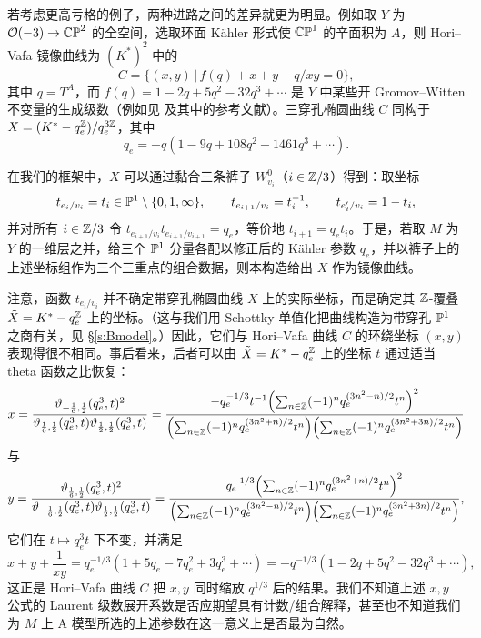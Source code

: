 若考虑更高亏格的例子，两种进路之间的差异就更为明显。例如取 $Y$ 为 $\mathcal{O}(-3)\to\mathbb{CP}^2$ 的全空间，选取环面 K\"ahler 形式使 $\mathbb{CP}^1$ 的辛面积为 $A$，则 Hori--Vafa 镜像曲线为 $(K^*)^2$ 中的
\[
C=\{(x,y)\,|\,f(q)+x+y+q/xy=0\},
\]
其中 $q=T^A$，而 $f(q)=1-2q+5q^2-32q^3+\cdots$ 是 $Y$ 中某些开 Gromov--Witten 不变量的生成级数（例如见 \cite[\S 5.3.3]{ChanLauLeung} 及其中的参考文献）。三穿孔椭圆曲线 $C$ 同构于 $X=(K^*-q_e^{\mathbb{Z}})/q_e^{3\mathbb{Z}}$，其中
\[
q_e=-q(1-9q+108q^2-1461q^3+\cdots).
\]

在我们的框架中，$X$ 可以通过黏合三条裤子 $W^0_{v_i}$（$i\in\mathbb{Z}/3$）得到：取坐标
\[
t_{e_i/v_i}=t_i\in\mathbb{P}^1\setminus\{0,1,\infty\},\qquad
t_{e_{i+1}/v_i}=t_i^{-1},\qquad t_{e'_i/v_i}=1-t_i,
\]
并对所有 $i\in\mathbb{Z}/3$ 令 $t_{e_{i+1}/v_i}t_{e_{i+1}/v_{i+1}}=q_e$，等价地 $t_{i+1}=q_et_i$。于是，若取 $M$ 为 $Y$ 的一维层之并，给三个 $\mathbb{P}^1$ 分量各配以修正后的 K\"ahler 参数 $q_e$，并以裤子上的上述坐标组作为三个三重点的组合数据，则本构造给出 $X$ 作为镜像曲线。

注意，函数 $t_{e_i/v_i}$ 并不确定带穿孔椭圆曲线 $X$ 上的实际坐标，而是确定其 $\mathbb{Z}$-覆叠 $\tilde X=K^*-q_e^{\mathbb{Z}}$ 上的坐标。（这与我们用 Schottky 单值化把曲线构造为带穿孔 $\mathbb{P}^1$ 之商有关，见 §\ref{s:Bmodel}。）因此，它们与 Hori--Vafa 曲线 $C$ 的环绕坐标 $(x,y)$ 表现得很不相同。事后看来，后者可以由 $\tilde X=K^*-q_e^{\mathbb{Z}}$ 上的坐标 $t$ 通过适当 theta 函数之比恢复：
\[
x=\frac{\vartheta_{-\frac16,\frac12}(q_e^3,t)^2}
{\vartheta_{\frac16,\frac12}(q_e^3,t)\vartheta_{\frac12,\frac12}(q_e^3,t)}=
\frac{-q_e^{-1/3}t^{-1}\Bigl(\sum_{n\in\mathbb{Z}}(-1)^n q_e^{(3n^2-n)/2}t^n\Bigr)^2}
{\Bigl(\sum_{n\in\mathbb{Z}}(-1)^n q_e^{(3n^2+n)/2}t^n\Bigr)
\Bigl(\sum_{n\in\mathbb{Z}}(-1)^n q_e^{(3n^2+3n)/2}t^n\Bigr)}
\]
与
\[
y=\frac{\vartheta_{\frac16,\frac12}(q_e^3,t)^2}
{\vartheta_{-\frac16,\frac12}(q_e^3,t)\vartheta_{\frac12,\frac12}(q_e^3,t)}=
\frac{q_e^{-1/3}\Bigl(\sum_{n\in\mathbb{Z}}(-1)^n q_e^{(3n^2+n)/2}t^n\Bigr)^2}
{\Bigl(\sum_{n\in\mathbb{Z}}(-1)^n q_e^{(3n^2-n)/2}t^n\Bigr)
\Bigl(\sum_{n\in\mathbb{Z}}(-1)^n q_e^{(3n^2+3n)/2}t^n\Bigr)},
\]
它们在 $t\mapsto q_e^3t$ 下不变，并满足
\[
x+y+\frac{1}{xy}=q_e^{-1/3}(1+5q_e-7q_e^2+3q_e^3+\cdots)
=-q^{-1/3}(1-2q+5q^2-32q^3+\cdots),
\]
这正是 Hori--Vafa 曲线 $C$ 把 $x,y$ 同时缩放 $q^{1/3}$ 后的结果。我们不知道上述 $x,y$ 公式的 Laurent 级数展开系数是否应期望具有计数/组合解释，甚至也不知道我们为 $M$ 上 A 模型所选的上述参数在这一意义上是否最为自然。
